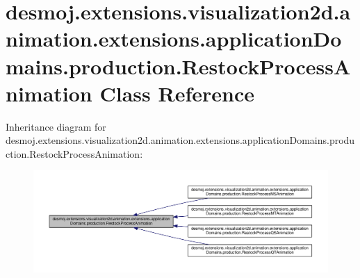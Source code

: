 \section{desmoj.\-extensions.\-visualization2d.\-animation.\-extensions.\-application\-Domains.\-production.\-Restock\-Process\-Animation Class Reference}
\label{classdesmoj_1_1extensions_1_1visualization2d_1_1animation_1_1extensions_1_1application_domains_1780cda2aa858e2a82770a7fe39425cb2}


Inheritance diagram for desmoj.\-extensions.\-visualization2d.\-animation.\-extensions.\-application\-Domains.\-production.\-Restock\-Process\-Animation\-:
\nopagebreak
\begin{figure}[H]
\begin{center}
\leavevmode
\includegraphics[width=350pt]{classdesmoj_1_1extensions_1_1visualization2d_1_1animation_1_1extensions_1_1application_domains_14f1f823badfba22d83737e0874971fe1}
\end{center}
\end{figure}



